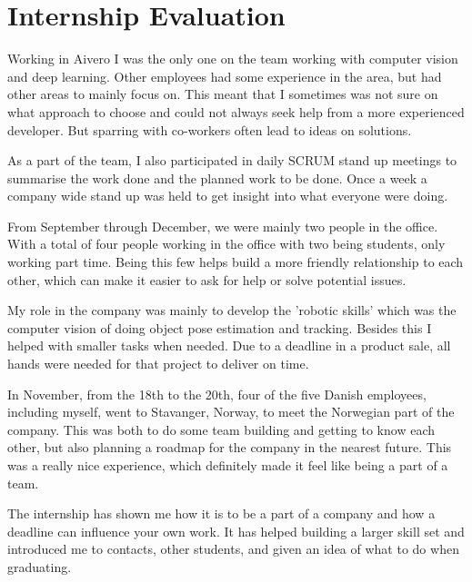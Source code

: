 \section{Internship Evaluation}
Working in Aivero I was the only one on the team working with computer vision and deep learning. Other employees had some experience in the area, but had other areas to mainly focus on. This meant that I sometimes was not sure on what approach to choose and could not always seek help from a more experienced developer. But sparring with co-workers often lead to ideas on solutions. 

As a part of the team, I also participated in daily SCRUM stand up meetings to summarise the work done and the planned work to be done. Once a week a company wide stand up was held to get insight into what everyone were doing.

From September through December, we were mainly two people in the office. With a total of four people working in the office with two being students, only working part time. Being this few helps build a more friendly relationship to each other, which can make it easier to ask for help or solve potential issues.

My role in the company was mainly to develop the 'robotic skills' which was the computer vision of doing object pose estimation and tracking. Besides this I helped with smaller tasks when needed. Due to a deadline in a product sale, all hands were needed for that project to deliver on time. 

In November, from the 18th to the 20th, four of the five Danish employees, including myself, went to Stavanger, Norway, to meet the Norwegian part of the company. This was both to do some team building and getting to know each other, but also planning a roadmap for the company in the nearest future. This was a really nice experience, which definitely made it feel like being a part of a team.

The internship has shown me how it is to be a part of a company and how a deadline can influence your own work. It has helped building a larger skill set and introduced me to contacts, other students, and given an idea of what to do when graduating.